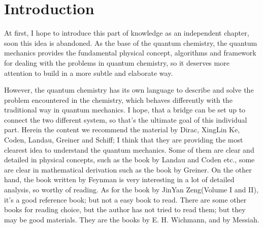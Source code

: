 %
%

\chapter{Introduction}
At first, I hope to introduce this part of knowledge as an
independent chapter, soon this idea is abandoned. As the base of the
quantum chemistry, the quantum mechanics provides the fundamental
physical concept, algorithms and framework for dealing with the
problems in quantum chemistry, so it deserves more attention to
build in a more subtle and elaborate way.

However, the quantum chemistry has its own language to describe and
solve the problem encountered in the chemistry, which behaves
differently with the traditional way in quantum mechanics. I hope,
that a bridge can be set up to connect the two different system, so
that's the ultimate goal of this individual part. Herein the content
we recommend the material by Dirac\cite{Dirac}, XingLin
Ke\cite{XingLinKe}, Coden\cite{Coden}, Landau\cite{Landau},
Greiner\cite{Greiner_Quantum_Mechanics} and
Schiff\cite{Schiff_Quantum_Mechanics}; I think that they are providing
the most clearest idea to understand the quantum mechanics. Some of
them are clear and detailed in physical concepts, such as the book by
Landau and Coden etc., some are clear in mathematical derivation such
as the book by Greiner. On the other hand, the book written by
Feynman\cite{Feynman-Lecture} is very interesting in a lot of detailed
analysis, so worthy of reading. As for the book by JinYan Zeng(Volume
I and II)\cite{ZengJinYan}, it's a good reference book; but not a easy
book to read. There are some other books for reading choice, but the
author has not tried to read them; but they may be good materials.
They are the books by E. H. Wichmann\cite{Wichmann}, and by
Messiah\cite{Messiah}.







